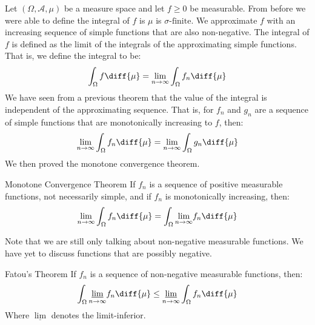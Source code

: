     Let $(\Omega,\mathcal{A},\mu)$ be a measure space and let
    $f\geq{0}$ be measurable. From before we were able to define
    the integral of $f$ is $\mu$ is $\sigma\textrm{-finite}$. We
    approximate $f$ with an increasing sequence of simple functions
    that are also non-negative. The integral of $f$ is defined as
    the limit of the integrals of the approximating
    simple functions. That is, we define the integral to be:
    \begin{equation}
        \int_{\Omega}f\diff{\mu}=
        \underset{n\rightarrow\infty}{\lim}
        \int_{\Omega}f_{n}\diff{\mu}
    \end{equation}
    We have seen from a previous theorem that the value
    of the integral is independent of the approximating
    sequence. That is, for $f_{n}$ and $g_{n}$ are a
    sequence of simple functions that are monotonically
    increasing to $f$, then:
    \begin{equation}
        \underset{n\rightarrow\infty}{\lim}
        \int_{\Omega}f_{n}\diff{\mu}=
        \underset{n\rightarrow\infty}{\lim}
        \int_{\Omega}g_{n}\diff{\mu}
    \end{equation}
    We then proved the monotone convergence theorem.
    \begin{ltheorem}{Monotone Convergence Theorem}
        If $f_{n}$ is a sequence of positive measurable functions,
        not necessarily simple, and if $f_{n}$ is monotonically
        increasing, then:
        \begin{equation}
            \underset{n\rightarrow\infty}{\lim}\int_{\Omega}f_{n}\diff{\mu}
            =\int_{\Omega}\underset{n\rightarrow\infty}{\lim}f_{n}\diff{\mu}
        \end{equation}
    \end{ltheorem}
    Note that we are still only talking about non-negative measurable
    functions. We have yet to discuss functions that are possibly negative.
    \begin{ltheorem}{Fatou's Theorem}
        If $f_{n}$ is a sequence of non-negative measurable functions, then:
        \begin{equation}
            \int_{\Omega}\underset{n\rightarrow\infty}{\underline{\lim}}
                f_{n}\diff{\mu}
            \leq\underset{n\rightarrow\infty}{\underline{\lim}}
                \int_{\Omega}f_{n}\diff{\mu}
        \end{equation}
        Where $\underline{\lim}$ denotes the limit-inferior.
    \end{ltheorem}
